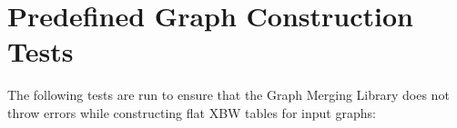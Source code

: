 \documentclass[a4paper,12pt,twoside,BCOR=10mm]{scrbook}
\begin{document}
\section{Predefined Graph Construction Tests}
\label{sec:appendix_graph_const_tests}
%


The following tests are run to ensure that the Graph Merging Library does not throw errors
while constructing flat XBW tables for input graphs:
\end{document}
